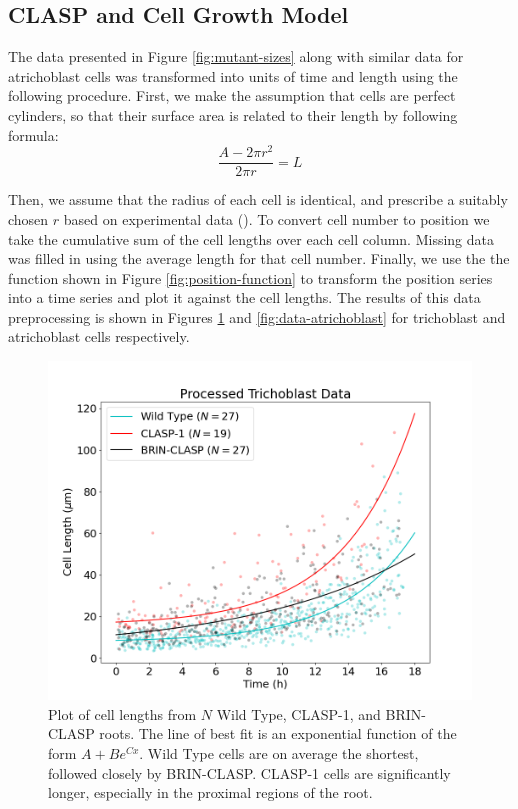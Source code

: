 \subsection{CLASP and Cell Growth Model}

The data presented in Figure \ref{fig:mutant-sizes} along with similar data for atrichoblast cells was transformed into units of time and length using the following procedure. First, we make the assumption that cells are perfect cylinders, so that their surface area is related to their length by following formula:
$$\frac{A - 2\pi r^{2}}{2\pi r} = L$$

Then, we assume that the radius of each cell is identical, and prescribe a suitably chosen $r$ based on experimental data (\cite{goh2023}). To convert cell number to position we take the cumulative sum of the cell lengths over each cell column. Missing data was filled in using the average length for that cell number. Finally, we use the the function shown in Figure \ref{fig:position-function} to transform the position series into a time series and plot it against the cell lengths. The results of this data preprocessing is shown in Figures \ref{fig:data-trichoblast} and \ref{fig:data-atrichoblast} for trichoblast and atrichoblast cells respectively.

\begin{figure}[!hbt]
    \centering
    \includegraphics[width=13cm]{img/data-trichoblast.png}
    \caption{Plot of cell lengths from $N$ Wild Type, CLASP-1, and BRIN-CLASP roots. The line of best fit is an exponential function of the form $A + Be^{Cx}$. Wild Type cells are on average the shortest, followed closely by BRIN-CLASP. CLASP-1 cells are significantly longer, especially in the proximal regions of the root.}
    \label{fig:data-trichoblast}
\end{figure}

